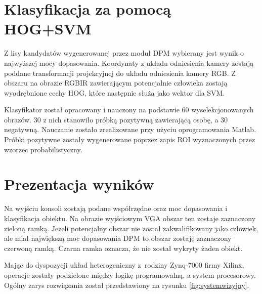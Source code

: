 

\section{Klasyfikacja za pomocą HOG+SVM}

Z lisy kandydatów wygenerowanej przez moduł DPM wybierany jest wynik o najwyższej mocy dopasowania. %
Koordynaty z układu odniesienia kamery zostają poddane transformacji projekcyjnej do układu odniesienia kamery RGB. 
Z obszaru na obrazie RGBIR zawierającym potencjalnie człowieka zostają wyodrębnione cechy HOG, które następnie służą jako wektor dla SVM.

Klasyfikator został opracowany i nauczony na podstawie 60 wyselekcjonowanych obrazów. %
30 z nich stanowiło próbką pozytywną zawierającą osobę, a 30 negatywną. 
Nauczanie zostało zrealizowane przy użyciu oprogramowania Matlab. 
Próbki pozytywne zostały wygenerowane poprzez zapis ROI wyznaczonych przez wzorzec probabilistyczny. 


\section{Prezentacja wyników}

Na wyjściu konsoli zostają podane współrzędne oraz moc dopasowania i klasyfikacja obiektu. %
Na obrazie wyjściowym VGA obszar ten zostaje zaznaczony zieloną ramką. 
Jeżeli potencjalny obszar nie został zakwalifikowany jako człowiek, ale miał największą moc dopasowania DPM to obszar zostaję zaznaczony czerwoną ramką. Czarna ramka oznacza, że nie został wykryty żaden obiekt. %

Mając do dyspozycji układ heterogeniczny z~rodziny Zynq-7000 firmy Xilinx, operacje zostały podzielone między logikę programowalną, a system procesorowy. Ogólny zarys rozwiązania został przedstawiony na rysunku \ref{fig:systemwizyjny}.

